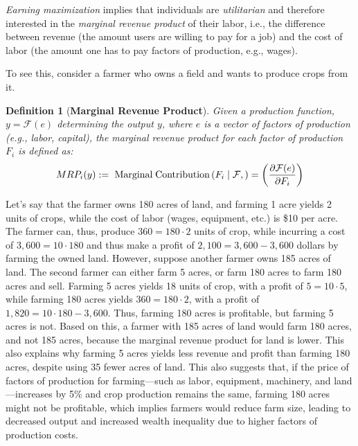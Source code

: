 \documentclass{article} %
\newtheorem{definition}{Definition}
\begin{document}
\emph{Earning maximization} implies that individuals are \emph{utilitarian} and therefore interested in the \emph{marginal revenue product} of their labor, i.e., the difference between revenue (the amount users are willing to pay for a job) and the cost of labor (the amount one has to pay factors of production, e.g., wages).

To see this, consider a farmer who owns a field and wants to produce crops from it.
\begin{definition}[{\bf Marginal Revenue Product}]\label{def:mrp}
    Given a production function, $y=\mathcal{F}(e)$ determining the output $y$, where $e$ is a vector of factors of production (e.g., labor, capital), the \textit{marginal revenue product} for each factor of production $F_i$ is defined as:
    \begin{equation*}
        MRP_i(y) := \textup{ Marginal} \; \textup{Contribution} \left(F_i \;  \lvert \; \mathcal{F}, \right)  = \left(\frac{\partial \mathcal{F}(e) }{\partial F_i}\right)
    \end{equation*}
\end{definition}

Let's say that the farmer owns 180 acres of land, and farming 1 acre yields 2 units of crops, while the cost of labor (wages, equipment, etc.) is \$10 per acre.
The farmer can, thus, produce $360=180\cdot 2$ units of crop, while incurring a cost of $3,600=10\cdot 180$ and thus make a profit of $2,100=3,600-3,600$ dollars by farming the owned land.
However, suppose another farmer owns 185 acres of land.
The second farmer can either farm 5 acres, or farm 180 acres to farm 180 acres and sell.
Farming 5 acres yields 18 units of crop, with a profit of $5=10\cdot 5$, while farming 180 acres yields $360=180\cdot 2$, with a profit of $1,820=10\cdot 180-3,600$.
Thus, farming 180 acres is profitable, but farming 5 acres is not.
Based on this, a farmer with 185 acres of land would farm 180 acres, and not 185 acres, because the marginal revenue product for land is lower.
This also explains why farming 5 acres yields less revenue and profit than farming 180 acres, despite using 35 fewer acres of land.
This also suggests that, if the price of factors of production for farming---such as labor, equipment, machinery, and land---increases by 5\% and crop production remains the same, farming 180 acres might not be profitable, which implies farmers would reduce farm size, leading to decreased output and increased wealth inequality due to higher factors of production costs.
\end{document}
